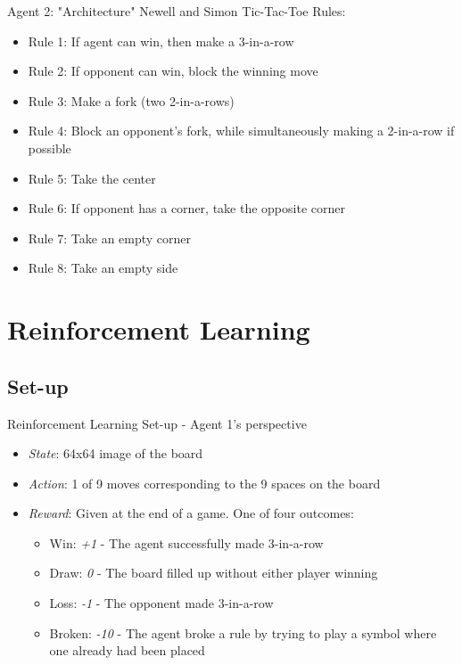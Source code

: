 \documentclass[11pt]{beamer}
\begin{document}
	\begin{frame}{Agent 2: "Architecture"}
		Newell and Simon Tic-Tac-Toe Rules:
		\begin{itemize}
			\item Rule 1: If agent can win, then make a 3-in-a-row
			\item Rule 2: If opponent can win, block the winning move
			\item Rule 3: Make a fork (two 2-in-a-rows)
			\item Rule 4: Block an opponent's fork, while simultaneously making a 2-in-a-row if possible
			\item Rule 5: Take the center
			\item Rule 6: If opponent has a corner, take the opposite corner
			\item Rule 7: Take an empty corner
			\item Rule 8: Take an empty side
		\end{itemize}		
	\end{frame}
	
	
	
	\section{Reinforcement Learning}
	
	\subsection{Set-up}
	\begin{frame}{Reinforcement Learning Set-up - Agent 1's perspective}
		\begin{itemize}
			\item {\it State}: 64x64 image of the board
			\item {\it Action}: 1 of 9 moves corresponding to the 9 spaces on the board
			\item {\it Reward}: Given at the end of a game. One of four outcomes:
			\begin{itemize}
				\item Win: {\it +1} - The agent successfully made 3-in-a-row 
				\item Draw: {\it 0} - The board filled up without either player winning
				\item Loss: {\it -1} - The opponent made 3-in-a-row
				\item Broken: {\it -10} - The agent broke a rule by trying to play a symbol where one already had been placed
			\end{itemize}
		\end{itemize}
	\end{frame}
	
\end{document}
